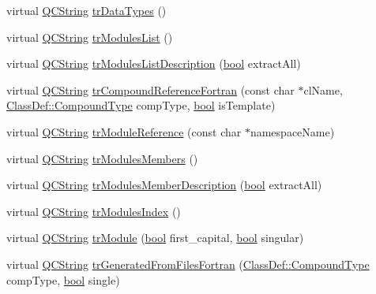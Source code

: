 \begin{DoxyCompactItemize}
\item 
virtual \hyperlink{class_q_c_string}{Q\+C\+String} \hyperlink{class_translator_serbian_cyrillic_ae57dfdf8293e9c8d8f880a4517e25066}{tr\+Data\+Types} ()
\item 
virtual \hyperlink{class_q_c_string}{Q\+C\+String} \hyperlink{class_translator_serbian_cyrillic_ac6079b257d5edfd465c0ffe6264b7326}{tr\+Modules\+List} ()
\item 
virtual \hyperlink{class_q_c_string}{Q\+C\+String} \hyperlink{class_translator_serbian_cyrillic_abd9e64404e252a52136e6168d354db14}{tr\+Modules\+List\+Description} (\hyperlink{qglobal_8h_a1062901a7428fdd9c7f180f5e01ea056}{bool} extract\+All)
\item 
virtual \hyperlink{class_q_c_string}{Q\+C\+String} \hyperlink{class_translator_serbian_cyrillic_a9a6e2df763f874c758d6e0878950d79d}{tr\+Compound\+Reference\+Fortran} (const char $\ast$cl\+Name, \hyperlink{class_class_def_ae70cf86d35fe954a94c566fbcfc87939}{Class\+Def\+::\+Compound\+Type} comp\+Type, \hyperlink{qglobal_8h_a1062901a7428fdd9c7f180f5e01ea056}{bool} is\+Template)
\item 
virtual \hyperlink{class_q_c_string}{Q\+C\+String} \hyperlink{class_translator_serbian_cyrillic_aee6e0a49dafe54960c2dbc685cb33f60}{tr\+Module\+Reference} (const char $\ast$namespace\+Name)
\item 
virtual \hyperlink{class_q_c_string}{Q\+C\+String} \hyperlink{class_translator_serbian_cyrillic_a4fc476f9d39e2a14d5dad2b1345ae1b1}{tr\+Modules\+Members} ()
\item 
virtual \hyperlink{class_q_c_string}{Q\+C\+String} \hyperlink{class_translator_serbian_cyrillic_a279c81aec7983e15a7917c000887a4ae}{tr\+Modules\+Member\+Description} (\hyperlink{qglobal_8h_a1062901a7428fdd9c7f180f5e01ea056}{bool} extract\+All)
\item 
virtual \hyperlink{class_q_c_string}{Q\+C\+String} \hyperlink{class_translator_serbian_cyrillic_aff7ed71b249065cac36f566467eb1cbb}{tr\+Modules\+Index} ()
\item 
virtual \hyperlink{class_q_c_string}{Q\+C\+String} \hyperlink{class_translator_serbian_cyrillic_a4bbc03d2bfbed6422b0737833d840d5e}{tr\+Module} (\hyperlink{qglobal_8h_a1062901a7428fdd9c7f180f5e01ea056}{bool} first\+\_\+capital, \hyperlink{qglobal_8h_a1062901a7428fdd9c7f180f5e01ea056}{bool} singular)
\item 
virtual \hyperlink{class_q_c_string}{Q\+C\+String} \hyperlink{class_translator_serbian_cyrillic_a5b2a691e024bc52e605ba86655d13500}{tr\+Generated\+From\+Files\+Fortran} (\hyperlink{class_class_def_ae70cf86d35fe954a94c566fbcfc87939}{Class\+Def\+::\+Compound\+Type} comp\+Type, \hyperlink{qglobal_8h_a1062901a7428fdd9c7f180f5e01ea056}{bool} single)

\end{DoxyCompactItemize}
